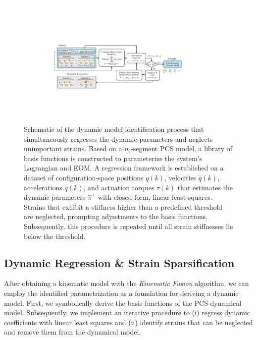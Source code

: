 \begin{figure}
    \centering
    \includegraphics[width=1.0\linewidth]{pcsregression/figures/diagram_dynamic_regression_v2_cropped.pdf}
    \caption{Schematic of the dynamic model identification process that simultaneously regresses the dynamic parameters and neglects unimportant strains. Based on a $n_\mathrm{s}$-segment \gls{PCS} model, a library of basis functions is constructed to parameterize the system’s Lagrangian and \gls{EOM}. A regression framework is established on a dataset of configuration-space positions $\dot{q}(k)$, velocities $\dot{q}(k)$, accelerations $\ddot{q}(k)$, and actuation torques $\tau(k)$ that estimates the dynamic parameters $\hat{\pi}^+$ with closed-form, linear least squares. Strains that exhibit a stiffness higher than a predefined threshold are neglected, prompting adjustments to the basis functions. Subsequently, this procedure is repeated until all strain stiffnesses lie below the threshold.}
    \label{fig:pcsregression:dyn_regr}
\end{figure}

\subsection{Dynamic Regression \& Strain Sparsification}
After obtaining a kinematic model with the \emph{Kinematic Fusion} algorithm, we can employ the identified parametrization as a foundation for deriving a dynamic model. %
First, we symbolically derive the basis functions of the \gls{PCS} dynamical model.
Subsequently, we implement an iterative procedure to (i) regress dynamic coefficients with linear least squares and (ii) identify strains that can be neglected and remove them from the dynamical model.

